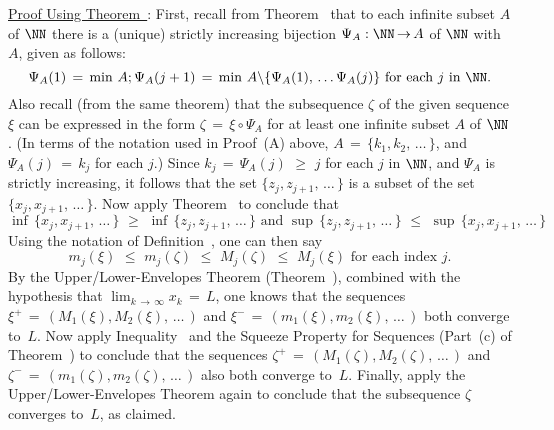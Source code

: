 {        \underline{Proof Using Theorem~}: First, recall from Theorem~ that to each infinite subset $A$ of ${\NN}$ there is a (unique) strictly increasing bijection ${\Psi}_{A}:{\NN} \,{\rightarrow}\, A$ of ${\NN}$ with $A$, given as follows:
        \begin{displaymath}
        {\Psi}_{A}(1) \,=\, \min\,A; {\Psi}_{A}(j+1) \,=\, \min\,A{\setminus}
    \{ {\Psi}_{A}(1),\,{\ldots}\,{\Psi}_{A}(j)\} \mbox{ for each $j$ in ${\NN}$}.
        \end{displaymath}
    Also recall (from the same theorem) that the subsequence ${\zeta}$ of the given sequence ${\xi}$ can be expressed in the form ${\zeta} \,=\, {\xi}{\circ}{\Psi}_{A}$ for at least one infinite subset $A$ of ${\NN}$.
    (In terms of the notation used in Proof~(A) above, $A \,=\, \{k_{1},k_{2},\,{\ldots}\,\}$, and ${\Psi}_{A}(j) \,=\, k_{j}$ for each $j$.)
    Since $k_{j} \,=\, {\Psi}_{A}(j)\,\,{\geq}\,\,j$ for each $j$ in ${\NN}$, and ${\Psi}_{A}$ is strictly increasing,
    it follows that the set $\{z_{j},z_{j+1},\,{\ldots}\,\}$ is a subset of the set $\{x_{j},x_{j+1},\,{\ldots}\,\}$.
Now apply Theorem~ to conclude that
        \begin{displaymath}
        {\inf}\,\{x_{j},x_{j+1},\,{\ldots}\,\} \,\,{\geq}\,\, 
        {\inf}\,\{z_{j},z_{j+1},\,{\ldots}\,\} \mbox{ and }
        {\sup}\,\{z_{j},z_{j+1},\,{\ldots}\,\} \,\,{\leq}\,\, 
        {\sup}\,\{x_{j},x_{j+1},\,{\ldots}\,\}
        \end{displaymath}
    Using the notation of Definition~, one can then say
        \begin{equation} 
        \label{IneqC.50}
        m_{j}({\xi})\,\,{\leq}\,\,m_{j}({\zeta})
    \,\,{\leq}\,\,
        M_{j}({\zeta})\,\,{\leq}\,\,M_{j}({\xi}) \mbox{ for each index $j$}.
        \end{equation}
    By the Upper/Lower-Envelopes Theorem (Theorem~), combined with the hypothesis that $\lim_{k \,{\rightarrow}\, {\infty}} x_{k} \,=\, L$, one knows that the sequences ${\xi}^{+} \,=\, (M_{1}({\xi}),M_{2}({\xi}),\,{\ldots}\,)$ and ${\xi}^{-} \,=\, (m_{1}({\xi}),m_{2}({\xi}),\,{\ldots}\,)$ both converge to~$L$.
    Now apply Inequality~ and the Squeeze Property for Sequences (Part~(c) of Theorem~) to conclude that the sequences ${\zeta}^{+} \,=\, (M_{1}({\zeta}),M_{2}({\zeta}),\,{\ldots}\,)$ and ${\zeta}^{-} \,=\, (m_{1}({\zeta}),m_{2}({\zeta}),\,{\ldots}\,)$ also both converge to~$L$.
    Finally, apply the Upper/Lower-Envelopes Theorem again to conclude that the subsequence ${\zeta}$ converges to~$L$, as claimed.


}
